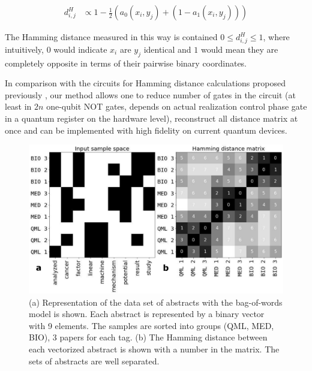 \documentclass[pra,showkeys,twocolumn,showpacs]{revtex4-1}
\begin{document}
\begin{align}
    d_{i,j}^H & \propto 1 - \frac{1}{2}(a_0(x_i,y_j) + (1-a_1(x_i,y_j)))
\end{align}

The Hamming distance measured in this way is contained $0 \leq d_{i,j}^H \leq 1$, where intuitively, $0$ would indicate $x_i$ are $y_j$ identical and $1$ would mean they are completely opposite in terms of their pairwise binary coordinates.

In comparison with the circuits for Hamming distance calculations proposed previously \cite{trugenberger2001}, our method allows one to reduce number of gates in the circuit (at least in $2n$ one-qubit NOT gates, depends on actual realization control phase gate in a quantum register on the hardware level), reconstruct all distance matrix at once and can be implemented with high fidelity on current quantum devices.


 
%

%

\begin{figure}[t]
	\label{fig:vectorized_sample}
	\includegraphics[width=0.95\columnwidth]{vectorized_sample.png}
	\caption{
		(a) Representation of the data set of abstracts with the bag-of-words model is shown. 
		Each abstract is represented by a binary vector with 9 elements. 
		The samples are sorted into groups (QML, MED, BIO), 3 papers for each tag.  
		(b) The Hamming distance between each vectorized abstract is shown with a number in the matrix. 
		The sets of abstracts are well separated.
	} 
\end{figure}
\end{document}

